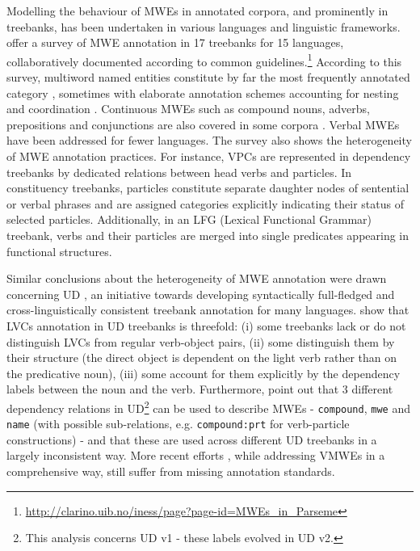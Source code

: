 \documentclass[output=paper,
modfonts,
]{langscibook}
\begin{document}
Modelling the behaviour of MWEs in annotated corpora, and prominently in treebanks, has been undertaken in various languages and linguistic frameworks. \citet{rosen:hal-01226001} offer a survey of MWE annotation in 17 treebanks for 15 languages, collaboratively documented according to common guidelines.\footnote{{\scriptsize \url{http://clarino.uib.no/iness/page?page-id=MWEs_in_Parseme}}}  
According to this survey, multiword named entities constitute by far the most frequently annotated category \citep{erjavec2010jos}, sometimes with elaborate annotation schemes accounting for nesting and coordination \citep{savaryetal10}. Continuous MWEs such as compound nouns, adverbs, prepositions and conjunctions are also covered in some corpora \citep{abeille:2003:ftb,Laporteetal08a,branco2010}. Verbal MWEs 
have been addressed for fewer languages. The survey also shows the heterogeneity of MWE annotation practices. For instance, VPCs %
are represented in dependency treebanks by dedicated relations between head verbs and particles. In constituency treebanks, particles constitute separate daughter nodes of sentential or verbal phrases and are assigned categories explicitly indicating their status of selected particles. Additionally, in an LFG (Lexical Functional Grammar) treebank, verbs and their particles are merged into single predicates appearing in functional structures.


Similar conclusions about the heterogeneity of MWE annotation were drawn concerning UD \citep{mcdonald-EtAl:2013:Short}, an initiative towards developing syntactically full-fledged and cross-linguistically consistent treebank annotation for many languages. 
\citet{NivreVincze15} show that LVCs annotation in UD treebanks is threefold: (i) some treebanks lack or do not distinguish LVCs from regular verb-object pairs, (ii) some distinguish them by their structure (the direct object is dependent on the light verb rather than on the predicative noun), (iii) some account for them explicitly by the dependency labels between the noun and the verb. Furthermore, \citet{DeSmedtetal15} point out that 3 different dependency relations in UD\footnote{This analysis concerns UD v1 - these labels evolved in UD v2.} can be used to describe MWEs - \texttt{compound}, \texttt{mwe} and \texttt{name} (with possible sub-relations, e.g. \texttt{compound:prt} for verb-particle constructions) 
- and that these are used across different UD treebanks in a largely inconsistent way.  
More recent efforts \citep{ciclingkubra}, while addressing VMWEs in a comprehensive way, still suffer from missing annotation standards.
\end{document}
